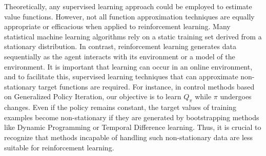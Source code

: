 Theoretically, any supervised learning approach could be employed to estimate value functions. However, not all function approximation techniques are equally appropriate or efficacious when applied to reinforcement learning. Many statistical machine learning algorithms rely on a static training set derived from a stationary distribution. In contrast, reinforcement learning generates data sequentially as the agent interacts with its environment or a model of the environment. It is important that learning can occur in an online environment, and to facilitate this, supervised learning techniques that can approximate non-stationary target functions are required.
For instance, in control methods based on Generalized Policy Iteration, our objective is to learn $Q_{\pi}$ while $\pi$ undergoes changes. Even if the policy remains constant, the target values of training examples become non-stationary if they are generated by bootstrapping methods like Dynamic Programming or Temporal Difference learning. Thus, it is crucial to recognize that methods incapable of handling such non-stationary data are less suitable for reinforcement learning.

